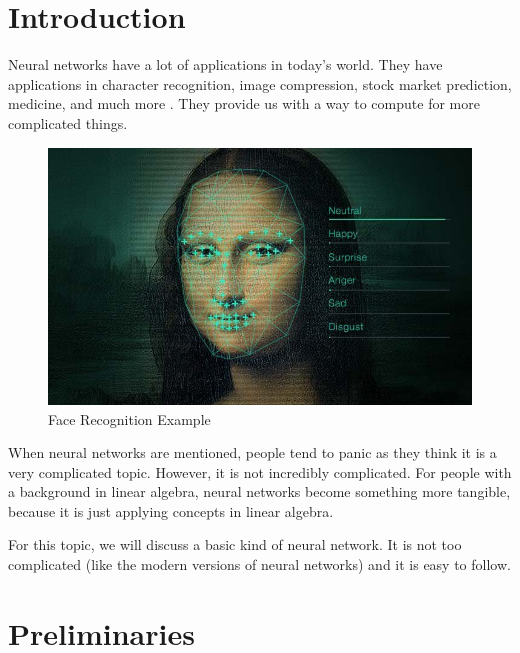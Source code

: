 \documentclass[a4paper, 11pt, english]{article}
\begin{document}
\section{Introduction}
Neural networks have a lot of applications in today's world. They have applications in character recognition, image compression, stock market prediction, medicine, and much more \cite{dk1}. They provide us with a way to compute for more complicated things. %

\begin{figure}[H]
  \centering
  \includegraphics[width=12cm]{images/intro1.jpg}
  \caption{Face Recognition Example \cite{targett_nunns_ball_2018}} %
  \label{fig:intro1}
\end{figure}

\par When neural networks are mentioned, people tend to panic as they think it is a very complicated topic. However, it is not incredibly complicated. For people with a background in linear algebra, neural networks become something more tangible, because it is just applying concepts in linear algebra.
\par For this topic, we will discuss a basic kind of neural network. It is not too complicated (like the modern versions of neural networks) and it is easy to follow.

\section{Preliminaries}
\end{document}
